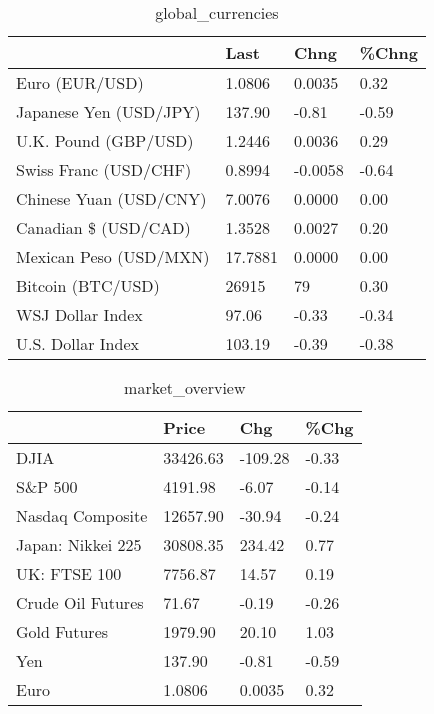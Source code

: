 \documentclass{article}%
\begin{document}
%


\begin{table}[htbp]%
\caption{global\_currencies}%
\centering%
\begin{adjustbox}{width=1\textwidth}%
\begin{tabular}{llll}
\toprule
                       &    Last &    Chng & \%Chng \\
\midrule
        Euro (EUR/USD) &  1.0806 &  0.0035 &  0.32 \\
Japanese Yen (USD/JPY) &  137.90 &   -0.81 & -0.59 \\
  U.K. Pound (GBP/USD) &  1.2446 &  0.0036 &  0.29 \\
 Swiss Franc (USD/CHF) &  0.8994 & -0.0058 & -0.64 \\
Chinese Yuan (USD/CNY) &  7.0076 &  0.0000 &  0.00 \\
  Canadian \$ (USD/CAD) &  1.3528 &  0.0027 &  0.20 \\
Mexican Peso (USD/MXN) & 17.7881 &  0.0000 &  0.00 \\
     Bitcoin (BTC/USD) &   26915 &      79 &  0.30 \\
      WSJ Dollar Index &   97.06 &   -0.33 & -0.34 \\
     U.S. Dollar Index &  103.19 &   -0.39 & -0.38 \\
\bottomrule
\end{tabular}
%
\end{adjustbox}%
\end{table}

%


\begin{table}[htbp]%
\caption{market\_overview}%
\centering%
\begin{adjustbox}{width=1\textwidth}%
\begin{tabular}{llll}
\toprule
                  &    Price &     Chg &  \%Chg \\
\midrule
             DJIA & 33426.63 & -109.28 & -0.33 \\
          S\&P 500 &  4191.98 &   -6.07 & -0.14 \\
 Nasdaq Composite & 12657.90 &  -30.94 & -0.24 \\
Japan: Nikkei 225 & 30808.35 &  234.42 &  0.77 \\
     UK: FTSE 100 &  7756.87 &   14.57 &  0.19 \\
Crude Oil Futures &    71.67 &   -0.19 & -0.26 \\
     Gold Futures &  1979.90 &   20.10 &  1.03 \\
              Yen &   137.90 &   -0.81 & -0.59 \\
             Euro &   1.0806 &  0.0035 &  0.32 \\
\bottomrule
\end{tabular}
%
\end{adjustbox}%
\end{table}

%
\end{document}
